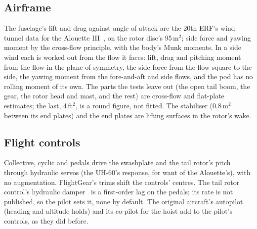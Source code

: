 \documentclass[10pt,a4paper,twocolumn]{article}
\begin{document}
\subsection{Airframe}
The fuselage's lift and drag against angle of attack are the 20th ERF's wind tunnel data for the Alouette III~\cite{e94}, on the rotor
disc's 95\,m$^2$; side force and yawing moment by the cross-flow principle, with the body's Munk moments. In a side wind each is worked out
from the flow it faces: lift, drag and pitching moment from the flow in the plane of symmetry, the side force from the flow square to the
side, the yawing moment from the fore-and-aft and side flows, and the pod has no rolling moment of its own. The parts the tests leave out
(the open tail boom, the gear, the rotor head and mast, and the rest) are cross-flow and flat-plate estimates; the last, 4\,ft$^2$, is a
round figure, not fitted. The stabiliser (0.8\,m$^2$ between its end plates) and the end plates are lifting surfaces in the rotor's wake.

\subsection{Flight controls}
Collective, cyclic and pedals drive the swashplate and the tail rotor's pitch through hydraulic servos (the UH-60's response, for want of the
Alouette's), with no augmentation. FlightGear's trims shift the controls' centres. The tail rotor control's hydraulic
damper~\cite{spec} is a first-order lag on the pedals; its rate is not published, so the pilot sets it, none by default. The original
aircraft's autopilot (heading and altitude holds) and its co-pilot for the hoist add to the pilot's controls, as they did before.
\end{document}
